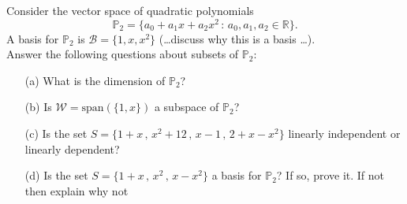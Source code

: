 \begin{problem}
    Consider the vector space of quadratic polynomials 
    \[ \mathbb{P}_2 = \{ a_0 + a_1 x + a_2 x^2 \, : \, a_0, a_1, a_2 \in \mathbb{R} \}. \]
    A basis for $\mathbb{P}_2$ is $\mathcal{B} = \{1,x,x^2\}$ (\dots discuss why this is a basis
    \dots).\\
    Answer the following questions about subsets of $\mathbb{P}_2$:
    \begin{enumerate}
        \item[(a)] What is the dimension of $\mathbb{P}_2$?
        \item[(b)] Is $\mathcal{W} = \text{span}(\{1,x\})$ a subspace of $\mathbb{P}_2$?
        \item[(c)] Is the set $S = \{ 1+x\,,\,x^2+12\,,\,x-1\,,\,2+x-x^2\}$ linearly
            independent or linearly dependent?
        \item[(d)] Is the set $S = \{1+x \,,\, x^2\,,\, x-x^2\}$ a basis for
            $\mathbb{P}_2$?  If so, prove it.  If not then explain why not
    \end{enumerate}
\end{problem}


